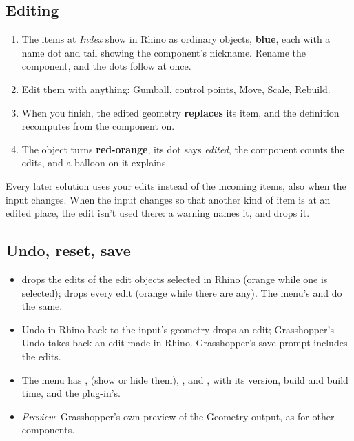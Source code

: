 \subsection{Editing}

\begin{enumerate}[label=\arabic*.]
  \item The items at \emph{Index} show in Rhino as ordinary objects, \textbf{blue}, each with a name dot and tail showing
        the component's nickname. Rename the component, and the dots follow at once.
  \item Edit them with anything: Gumball, control points, Move, Scale, Rebuild.
  \item When you finish, the edited geometry \textbf{replaces} its item, and the definition recomputes from the component on.
  \item The object turns \textbf{red-orange}, its dot says \emph{edited}, the component counts the edits, and a balloon
        on it explains.
\end{enumerate}

Every later solution uses your edits instead of the incoming items, also when the input changes. When the input
changes so that another kind of item is at an edited place, the edit isn't used there: a warning names it, and
 drops it.

\subsection{Undo, reset, save}

\begin{itemize}
  \item {} drops the edits of the edit objects selected in Rhino (orange while one is selected);
         drops every edit (orange while there are any). The menu's  and
         do the same.
  \item Undo in Rhino back to the input's geometry drops an edit; Grasshopper's Undo takes back an edit made in
        Rhino. Grasshopper's save prompt includes the edits.
  \item The menu has ,  (show or hide them), ,
        and , with its version, build and build time, and the plug-in's.
  \item \emph{Preview}: Grasshopper's own preview of the Geometry output, as for other components.
\end{itemize}

